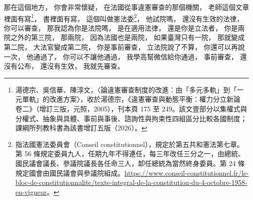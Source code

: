 \hypertarget{w06:cue:1123}{}那在這個地方，
\hypertarget{w06:cue:1124}{}你會非常懷疑，
\hypertarget{w06:cue:1125}{}在法國從事違憲審查的那個機關，
\hypertarget{w06:cue:1126}{}老師這個文章裡面有寫\footnote{湯德宗、吳信華、陳淳文，〈論違憲審查制度的改進：由「多元多軌」到「一元單軌」的改進方案〉，收於湯德宗，《違憲審查與動態平衡：權力分立新論 卷二》（增訂三版，元照，2005），刊本頁 175 至 249。該文壹部分以集權式與分權式、抽象與具體、事前與事後、諮詢性與拘束性四組區分比較各國制度；課綱所列教科書為該書增訂五版（2026）。}，
\hypertarget{w06:cue:1127}{}書裡面有寫，
\hypertarget{w06:cue:1128}{}這個叫做憲法委\footnote{指法國憲法委員會（Conseil constitutionnel），規定於第五共和憲法第七章。第 56 條規定委員九人，任期九年不得連任，每三年改任三分之一，由總統、國民議會議長、參議院議長各任命三人，卸任總統為當然終身委員。第 24 條規定國會由國民議會與參議院組成。\url{https://www.conseil-constitutionnel.fr/le-bloc-de-constitutionnalite/texte-integral-de-la-constitution-du-4-octobre-1958-en-vigueur}。}，
\hypertarget{w06:cue:1129}{}他試院嗎，
\hypertarget{w06:cue:1130}{}還沒有生效的法律，
\hypertarget{w06:cue:1131}{}你可以審查，
\hypertarget{w06:cue:1132}{}那我認為你是法院嗎，
\hypertarget{w06:cue:1133}{}是在適用法律，
\hypertarget{w06:cue:1134}{}還是你是立法者，
\hypertarget{w06:cue:1135}{}你是兩院之外的第三院，
\hypertarget{w06:cue:1136}{}那兩院，
\hypertarget{w06:cue:1137}{}因為法國也是兩院，
\hypertarget{w06:cue:1138}{}如果臺灣只有一院，
\hypertarget{w06:cue:1139}{}那就變成第二院，
\hypertarget{w06:cue:1140}{}大法官變成第二院，
\hypertarget{w06:cue:1141}{}你是事前審查，
\hypertarget{w06:cue:1142}{}立法院說了不算，
\hypertarget{w06:cue:1143}{}你還可以再說一次，
\hypertarget{w06:cue:1144}{}他通過了，
\hypertarget{w06:cue:1145}{}你可以不讓他通過，
\hypertarget{w06:cue:1146}{}我學高幫微信給你通過，
\hypertarget{w06:cue:1147}{}事前審查，
\hypertarget{w06:cue:1148}{}還沒有公布，
\hypertarget{w06:cue:1149}{}還沒有生效，
\hypertarget{w06:cue:1150}{}我就先審查。

